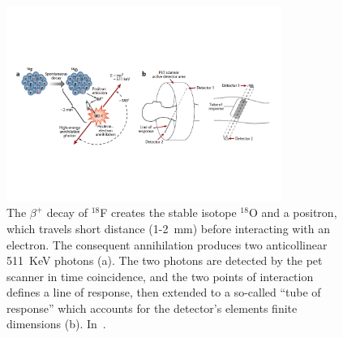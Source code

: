 \begin{figure}[!htbp]
\centering
\includegraphics[width=0.8\textwidth, trim = {0 3cm 0 3cm}, clip]{03_GraphicFiles/chapter1_Introduction/NM_PET_principle.pdf}
\caption{The $\beta^{+}$ decay of $^{18}$F creates the stable isotope $^{18}$O and a positron, which travels short distance (1-2~mm) before interacting with an electron. The consequent annihilation produces two anticollinear 511~KeV photons (a). The two photons are detected by the \gls{pet} scanner in time coincidence, and the two points of interaction defines a line of response, then extended to a so-called \enquote{tube of response} which accounts for the detector's elements finite dimensions (b). In~\cite{Vaquero2015}.}
\label{chap1::fig::NM_PET_princ}
\end{figure}   
